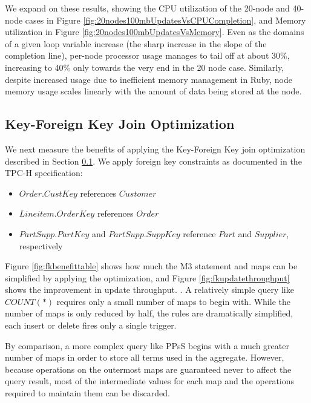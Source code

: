 We expand on these results, showing the CPU utilization of the 20-node and 40-node cases in Figure \ref{fig:20nodes100mbUpdatesVsCPUCompletion}, and Memory utilization in Figure \ref{fig:20nodes100mbUpdatesVsMemory}.  Even as the domains of a given loop variable increase (the sharp increase in the slope of the completion line), per-node processor usage manages to tail off at about 30\%, increasing to 40\% only towards the very end in the 20 node case.  Similarly, despite increased usage due to inefficient memory management in Ruby, node memory usage scales linearly with the amount of data being stored at the node.


\subsection{Key-Foreign Key Join Optimization}
\label{sec:key_fkey}
We next measure the benefits of applying the Key-Foreign Key join optimization described in Section \ref{sec:key_fkey}.  We apply foreign key constraints as documented in the TPC-H specification: 
\begin{itemize}
\item $Order.CustKey$ references $Customer$
\item $Lineitem.OrderKey$ references $Order$
\item $PartSupp.PartKey$ and $PartSupp.SuppKey$ reference $Part$ and $Supplier$, respectively

\end{itemize}

Figure \ref{fig:fkbenefittable} shows how much the M3 statement and maps can be simplified by applying the optimization, and Figure \ref{fig:fkupdatethroughput} shows the improvement in update throughput.  .  A relatively simple query like $COUNT(*)$ requires only a small number of maps to begin with.  While the number of maps is only reduced by half, the rules are dramatically simplified, each insert or delete fires only a single trigger.

By comparison, a more complex query like PPsS begins with a much greater number of maps in order to store all terms used in the aggregate.  However, because operations on the outermost maps are guaranteed never to affect the query result, most of the intermediate values for each map and the operations required to maintain them can be discarded.

